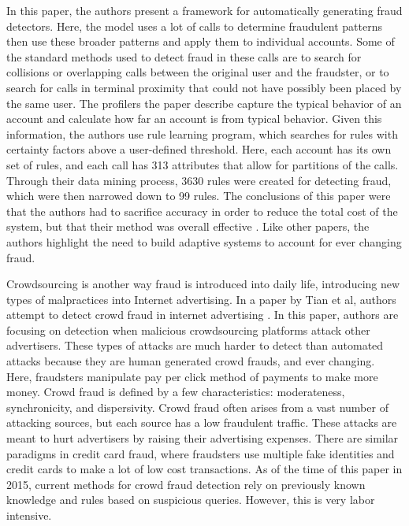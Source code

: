 \documentclass[midd]{thesis}
\begin{document}
In this paper, the authors present a framework for automatically generating fraud detectors. Here, the model uses a lot of calls to determine fraudulent patterns then use these broader patterns and apply them to individual accounts. Some of the standard methods used to detect fraud in these calls are to search for collisions or overlapping calls between the original user and the fraudster, or to search for calls in terminal proximity that could not have possibly been placed by the same user. The profilers the paper describe capture the typical behavior of an account and calculate how far an account is from typical behavior. Given this information, the authors use rule learning program, which searches for rules with certainty factors above a user-defined threshold. Here, each account has its own set of rules, and each call has 313 attributes that allow for partitions of the calls. Through their data mining process, 3630 rules were created for detecting fraud, which were then narrowed down to 99 rules. The conclusions of this paper were that the authors had to sacrifice accuracy in order to reduce the total cost of the system, but that their method was overall effective \cite{Fawcett1996}. Like other papers, the authors highlight the need to build adaptive systems to account for ever changing fraud.

Crowdsourcing is another way fraud is introduced into daily life, introducing new types of malpractices into Internet advertising. In a paper by Tian et al, authors attempt to detect crowd fraud in internet advertising  \cite{Tian}. In this paper, authors are focusing on detection when malicious crowdsourcing platforms attack other advertisers. These types of attacks are much harder to detect than automated attacks because they are human generated crowd frauds, and ever changing. Here, fraudsters manipulate pay per click method of payments to make more money. Crowd fraud is defined by a few characteristics: moderateness, synchronicity, and dispersivity. Crowd fraud often arises from a vast number of attacking sources, but each source has a low fraudulent traffic. These attacks are meant to hurt advertisers by raising their advertising expenses. There are similar paradigms in credit card fraud, where fraudsters use multiple fake identities and credit cards to make a lot of low cost transactions. As of the time of this paper in 2015, current methods for crowd fraud detection rely on previously known knowledge and rules based on suspicious queries. However, this is very labor intensive. 
\end{document}
